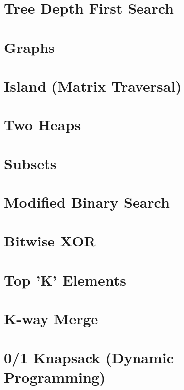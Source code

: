 \section{Tree Depth First Search}


\section{Graphs}


\section{Island (Matrix Traversal)}


\section{Two Heaps}


\section{Subsets}


\section{Modified Binary Search}


\section{Bitwise XOR}


\section{Top 'K' Elements}


\section{K-way Merge}





\section{0/1 Knapsack (Dynamic Programming)}


